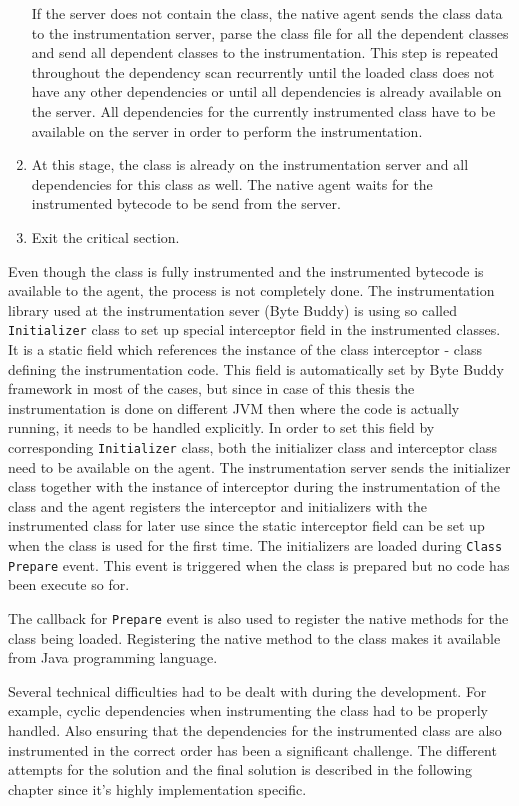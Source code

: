 \begin{enumerate}
	If the server does not contain the class, the native agent sends the class data to the instrumentation server, parse the class file for all the dependent classes and send all dependent classes to the instrumentation. This step is repeated throughout the dependency scan recurrently until the loaded class does not have any other dependencies or until all dependencies is already available on the server. All dependencies for the currently instrumented class have to be available on the server in order to perform the instrumentation.

	\item At this stage, the class is already on the instrumentation server and all dependencies for this class as well. The native agent waits for the instrumented bytecode to be send from the server. 
	\item Exit the critical section.
\end{enumerate}	
Even though the class is fully instrumented and the instrumented bytecode is available to the agent, the process is not completely done. The instrumentation library used at the instrumentation sever (Byte Buddy) is using so called \texttt{Initializer} class to set up special interceptor field in the instrumented classes. It is a static field which references the instance of the class interceptor - class defining the instrumentation code. This field is automatically set by Byte Buddy framework in most of the cases, but since in case of this thesis the instrumentation is done on different JVM then where the code is actually running, it needs to be handled explicitly. In order to set this field by corresponding \texttt{Initializer} class, both the initializer class and interceptor class need to be available on the agent. The instrumentation server sends the initializer class together with the instance of interceptor during the instrumentation of the class and the agent registers the interceptor and initializers with the instrumented class for later use since the static interceptor field can be set up when the class is used for the first time. The initializers are loaded during  \texttt{Class Prepare} event. This event is triggered when the class is prepared but no code has been execute so for. 

The callback for \texttt{Prepare} event is also used to register the native methods for the class being loaded. Registering the native method to the class makes it available from Java programming language.

Several technical difficulties had to be dealt with during the development. For example,  cyclic dependencies when instrumenting the class had to be properly handled. Also ensuring that the dependencies for the instrumented class are also instrumented in the correct order has been a significant challenge. The different attempts for the solution and the final solution is described in the following chapter since it's highly implementation specific.
